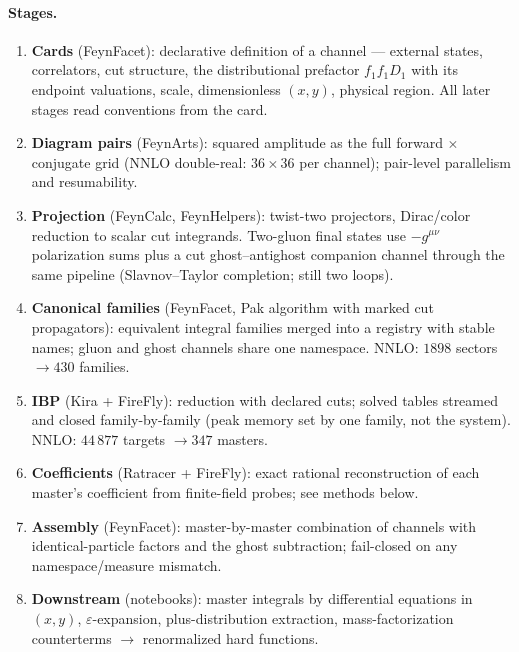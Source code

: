 \documentclass[10pt]{article}
\newcommand{\eps}{\varepsilon}
\begin{document}
\paragraph{Stages.}
\begin{enumerate}\itemsep0.15ex
\item \textbf{Cards} (\textsf{FeynFacet}): declarative definition of a
  channel --- external states, correlators, cut structure, the
  distributional prefactor $f_1 f_1 D_1$ with its endpoint valuations,
  scale, dimensionless $(x,y)$, physical region.  All later stages
  read conventions from the card.
\item \textbf{Diagram pairs} (\textsf{FeynArts}): squared amplitude as
  the full forward $\times$ conjugate grid (NNLO double-real:
  $36\times36$ per channel); pair-level parallelism and resumability.
\item \textbf{Projection} (\textsf{FeynCalc}, \textsf{FeynHelpers}):
  twist-two projectors, Dirac/color reduction to scalar cut
  integrands.  Two-gluon final states use $-g^{\mu\nu}$ polarization
  sums plus a cut ghost--antighost companion channel through the same
  pipeline (Slavnov--Taylor completion; still two loops).
\item \textbf{Canonical families} (\textsf{FeynFacet}, Pak algorithm
  with marked cut propagators): equivalent integral families merged
  into a registry with stable names; gluon and ghost channels share
  one namespace.  NNLO: $1898$ sectors $\to 430$ families.
\item \textbf{IBP} (\textsf{Kira} + \textsf{FireFly}): reduction with
  declared cuts; solved tables streamed and closed family-by-family
  (peak memory set by one family, not the system).  NNLO: $44\,877$
  targets $\to 347$ masters.
\item \textbf{Coefficients} (\textsf{Ratracer} + \textsf{FireFly}):
  exact rational reconstruction of each master's coefficient from
  finite-field probes; see methods below.
\item \textbf{Assembly} (\textsf{FeynFacet}): master-by-master
  combination of channels with identical-particle factors and the
  ghost subtraction; fail-closed on any namespace/measure mismatch.
\item \textbf{Downstream} (notebooks): master integrals by
  differential equations in $(x,y)$, $\eps$-expansion,
  plus-distribution extraction, mass-factorization counterterms
  $\to$ renormalized hard functions.
\end{enumerate}
\end{document}
